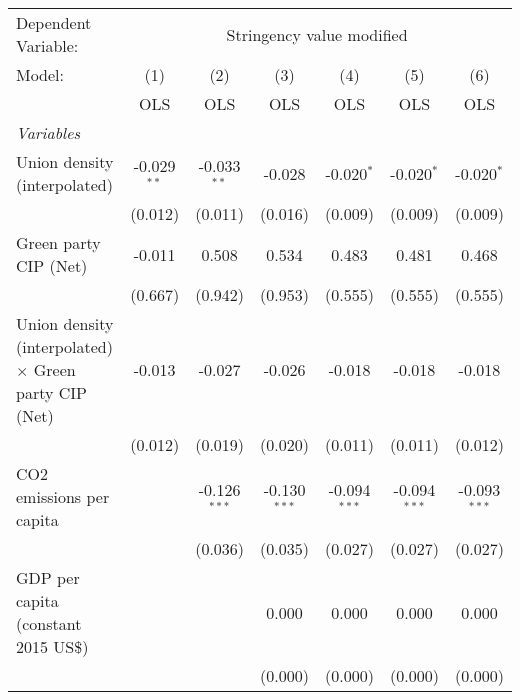 
\begingroup
\centering
\begin{tabular}{lcccccc}
   \toprule
   Dependent Variable: & \multicolumn{6}{c}{Stringency value modified}\\
   Model:                                                       & (1)           & (2)            & (3)            & (4)            & (5)            & (6)\\  
                                                                &  OLS          & OLS            & OLS            & OLS            & OLS            & OLS\\  
   \midrule
   \emph{Variables}\\
   Union density (interpolated)                                 & -0.029$^{**}$ & -0.033$^{**}$  & -0.028         & -0.020$^{*}$   & -0.020$^{*}$   & -0.020$^{*}$\\   
                                                                & (0.012)       & (0.011)        & (0.016)        & (0.009)        & (0.009)        & (0.009)\\   
   Green party CIP (Net)                                        & -0.011        & 0.508          & 0.534          & 0.483          & 0.481          & 0.468\\   
                                                                & (0.667)       & (0.942)        & (0.953)        & (0.555)        & (0.555)        & (0.555)\\   
   Union density (interpolated) $\times$ Green party CIP (Net)  & -0.013        & -0.027         & -0.026         & -0.018         & -0.018         & -0.018\\   
                                                                & (0.012)       & (0.019)        & (0.020)        & (0.011)        & (0.011)        & (0.012)\\   
   CO2 emissions per capita                                     &               & -0.126$^{***}$ & -0.130$^{***}$ & -0.094$^{***}$ & -0.094$^{***}$ & -0.093$^{***}$\\   
                                                                &               & (0.036)        & (0.035)        & (0.027)        & (0.027)        & (0.027)\\   
   GDP per capita (constant 2015 US\$)                          &               &                & 0.000          & 0.000          & 0.000          & 0.000\\   
                                                                &               &                & (0.000)        & (0.000)        & (0.000)        & (0.000)\\   

\end{tabular}
